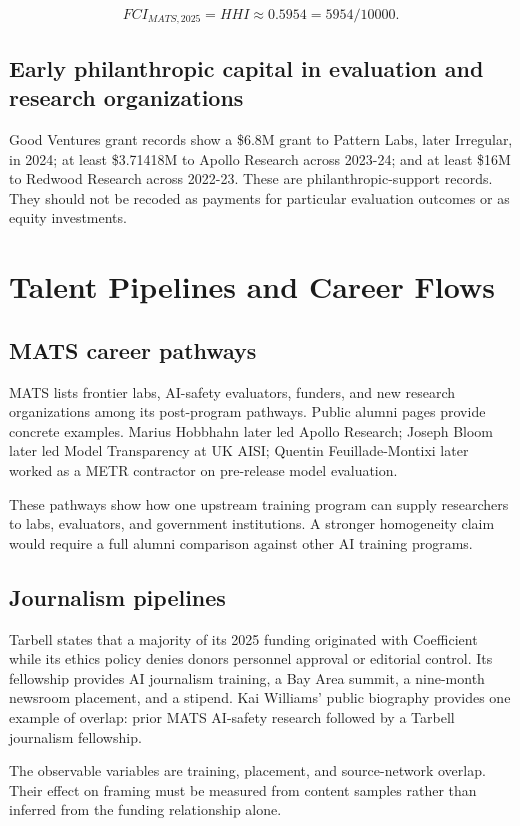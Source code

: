 \documentclass[11pt,twoside]{article}
\begin{document}
\[
FCI_{MATS,2025}=HHI\approx0.5954=5954/10000.
\]

\subsection{Early philanthropic capital in evaluation and research organizations}
Good Ventures grant records show a \$6.8M grant to Pattern Labs, later Irregular, in 2024; at least \$3.71418M to Apollo Research across 2023-24; and at least \$16M to Redwood Research across 2022-23. These are philanthropic-support records. They should not be recoded as payments for particular evaluation outcomes or as equity investments.

\section{Talent Pipelines and Career Flows}
\subsection{MATS career pathways}
MATS lists frontier labs, AI-safety evaluators, funders, and new research organizations among its post-program pathways. Public alumni pages provide concrete examples. Marius Hobbhahn later led Apollo Research; Joseph Bloom later led Model Transparency at UK AISI; Quentin Feuillade-Montixi later worked as a METR contractor on pre-release model evaluation.

These pathways show how one upstream training program can supply researchers to labs, evaluators, and government institutions. A stronger homogeneity claim would require a full alumni comparison against other AI training programs.

\subsection{Journalism pipelines}
Tarbell states that a majority of its 2025 funding originated with Coefficient while its ethics policy denies donors personnel approval or editorial control. Its fellowship provides AI journalism training, a Bay Area summit, a nine-month newsroom placement, and a stipend. Kai Williams' public biography provides one example of overlap: prior MATS AI-safety research followed by a Tarbell journalism fellowship.

The observable variables are training, placement, and source-network overlap. Their effect on framing must be measured from content samples rather than inferred from the funding relationship alone.
\end{document}
